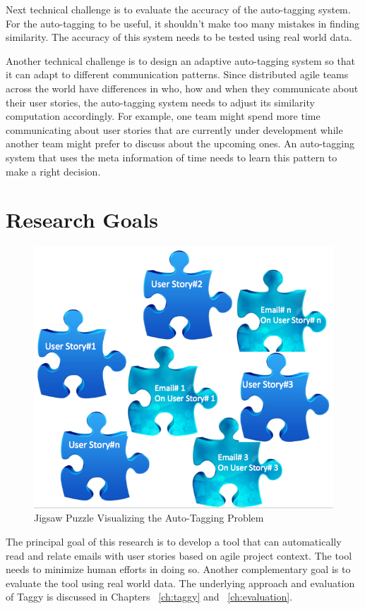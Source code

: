 Next technical challenge is to evaluate the accuracy of the auto-tagging system. For the auto-tagging to be useful, it shouldn't make too many mistakes in finding similarity. The accuracy of this system needs to be tested using real world data. 

Another technical challenge is to design an adaptive auto-tagging system so that it can adapt to different communication patterns. Since distributed agile teams across the world have differences in who, how and when they communicate about their user stories, the auto-tagging system needs to adjust its similarity computation accordingly. For example, one team might spend more time communicating about user stories that are currently under development while another team might prefer to discuss about the upcoming ones. An auto-tagging system that uses the meta information of time needs to learn this pattern to make a right decision.


\section{Research Goals}
\begin{figure}[bt]
	\centering
	\includegraphics[width=\textwidth]{Jigsaw.png}
    \caption{Jigsaw Puzzle Visualizing the Auto-Tagging Problem}
	\label{fig:jigsaw}
\end{figure}

The principal goal of this research is to develop a tool that can automatically read and relate emails with user stories based on agile project context. The tool needs to minimize human efforts in doing so. Another complementary goal is to evaluate the tool using real world data. The underlying approach and evaluation of Taggy is discussed in Chapters ~\ref{ch:taggy} and ~\ref{ch:evaluation}.

